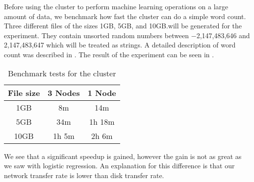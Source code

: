 \label{sec:benchmark}
Before using the cluster to perform machine learning operations on a large amount of data, we benchmark how fast the cluster can do a simple word count. Three different files of the sizes 1GB, 5GB, and 10GB.\@ will be generated for the experiment. They contain unsorted random numbers between $-$2,147,483,646 and 2,147,483,647 which will be treated as strings. A detailed description of word count was described in . The result of the experiment can be seen in . 
\begin{table}[!htb]
  \centering
  \begin{tabular}{|c|c c|}
    \hline
    File size & 3 Nodes & 1 Node \\
    \hline
    1GB & 8m & 14m\\ %
    5GB & 34m & 1h 18m \\ %
    10GB & 1h 5m & 2h 6m \\ %
    \hline
  \end{tabular}
  \caption{Benchmark tests for the cluster}
  \label{tab:bench}
\end{table}

We see that a significant speedup is gained, however the gain is not as great as we saw with logistic regression. An explanation for this difference is that our network transfer rate is lower than disk transfer rate.

